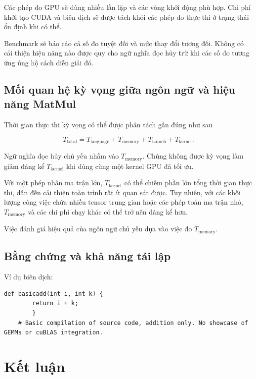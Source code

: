 \documentclass[a4paper]{article}
\begin{document}
	Các phép đo GPU sẽ dùng nhiều lần lặp và các vòng khởi động phù hợp. Chi phí khởi tạo CUDA \cite{CUDA} và biên dịch sẽ được tách khỏi các phép đo thực thi ở trạng thái ổn định khi có thể.
	
	Benchmark sẽ báo cáo cả số đo tuyệt đối và mức thay đổi tương đối. Không có cải thiện hiệu năng nào được quy cho ngữ nghĩa đọc hủy trừ khi các số đo tương ứng ủng hộ cách diễn giải đó.
	
	
	
	\subsection{Mối quan hệ kỳ vọng giữa ngôn ngữ và hiệu năng MatMul}
	
	Thời gian thực thi kỳ vọng có thể được phân tách gần đúng như sau
	
	\begin{equation}
		T_{\mathrm{total}} =
		T_{\mathrm{language}} +
		T_{\mathrm{memory}} +
		T_{\mathrm{launch}} +
		T_{\mathrm{kernel}}.
	\end{equation}
	
	Ngữ nghĩa đọc hủy chủ yếu nhắm vào $T_{\mathrm{memory}}$. Chúng không được kỳ vọng làm giảm đáng kể $T_{\mathrm{kernel}}$ khi dùng cùng một kernel GPU đã tối ưu.
	
	Với một phép nhân ma trận lớn, $T_{\mathrm{kernel}}$ có thể chiếm phần lớn tổng thời gian thực thi, dẫn đến cải thiện toàn trình rất ít quan sát được. Tuy nhiên, với các khối lượng công việc chứa nhiều tensor trung gian hoặc các phép toán ma trận nhỏ, $T_{\mathrm{memory}}$ và các chi phí chạy khác có thể trở nên đáng kể hơn. 

	Việc đánh giá hiệu quả của ngôn ngữ chủ yếu dựa vào việc đo $T_{\mathrm{memory}}$.
	
	
	
	
	\subsection{Bằng chứng và khả năng tái lập}
	\label{sec:evidence}
	
	Ví dụ biên dịch: 
	\begin{lstlisting}[caption = Ví dụ biên dịch]
	def basicadd(int i, int k) {
		return i + k;
		}
	# Basic compilation of source code, addition only. No showcase of GEMMs or cuBLAS integration.
	\end{lstlisting}
	\section{Kết luận}
\end{document}
